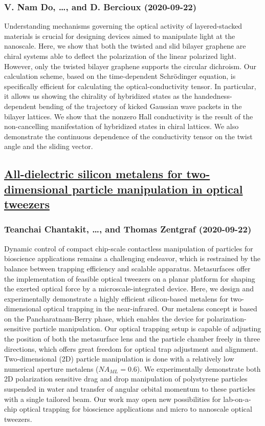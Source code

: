 {\subsubsection*{V. Nam Do, \dots, and D. Bercioux (2020-09-22)}
Understanding mechanisms governing the optical activity of layered-stacked
materials is crucial for designing devices aimed to manipulate light at the
nanoscale. Here, we show that both the twisted and slid bilayer graphene are
chiral systems able to deflect the polarization of the linear polarized light.
However, only the twisted bilayer graphene supports the circular dichroism. Our
calculation scheme, based on the time-dependent Schr\"odinger equation, is
specifically efficient for calculating the optical-conductivity tensor. In
particular, it allows us showing the chirality of hybridized states as the
handedness-dependent bending of the trajectory of kicked Gaussian wave packets
in the bilayer lattices. We show that the nonzero Hall conductivity is the
result of the non-cancelling manifestation of hybridized states in chiral
lattices. We also demonstrate the continuous dependence of the conductivity
tensor on the twist angle and the sliding vector.

\subsection*{\href{http://arxiv.org/abs/2009.10382v1}{All-dielectric silicon metalens for two-dimensional particle  manipulation in optical tweezers}}
\subsubsection*{Teanchai Chantakit, \dots, and Thomas Zentgraf (2020-09-22)}
Dynamic control of compact chip-scale contactless manipulation of particles
for bioscience applications remains a challenging endeavor, which is restrained
by the balance between trapping efficiency and scalable apparatus. Metasurfaces
offer the implementation of feasible optical tweezers on a planar platform for
shaping the exerted optical force by a microscale-integrated device. Here, we
design and experimentally demonstrate a highly efficient silicon-based metalens
for two-dimensional optical trapping in the near-infrared. Our metalens concept
is based on the Pancharatnam-Berry phase, which enables the device for
polarization-sensitive particle manipulation. Our optical trapping setup is
capable of adjusting the position of both the metasurface lens and the particle
chamber freely in three directions, which offers great freedom for optical trap
adjustment and alignment. Two-dimensional (2D) particle manipulation is done
with a relatively low numerical aperture metalens ($NA_{ML}=0.6$). We
experimentally demonstrate both 2D polarization sensitive drag and drop
manipulation of polystyrene particles suspended in water and transfer of
angular orbital momentum to these particles with a single tailored beam. Our
work may open new possibilities for lab-on-a-chip optical trapping for
bioscience applications and micro to nanoscale optical tweezers.

}
